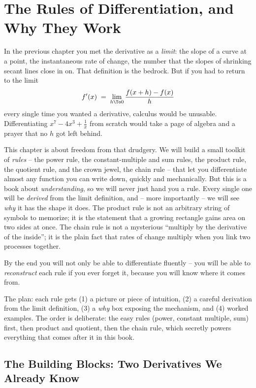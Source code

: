 \chapter{The Rules of Differentiation, and Why They Work}

In the previous chapter you met the derivative as a \emph{limit}: the slope of a curve
at a point, the instantaneous rate of change, the number that the slopes of shrinking
secant lines close in on. That definition is the bedrock. But if you had to return to
the limit
\[
  f'(x) \;=\; \lim_{h\To 0}\frac{f(x+h)-f(x)}{h}
\]
every single time you wanted a derivative, calculus would be unusable. Differentiating
$x^7 - 4x^3 + \tfrac{1}{x}$ from scratch would take a page of algebra and a prayer that
no $h$ got left behind.

This chapter is about freedom from that drudgery. We will build a small toolkit of
\emph{rules} -- the power rule, the constant-multiple and sum rules, the product rule,
the quotient rule, and the crown jewel, the chain rule -- that let you differentiate
almost any function you can write down, quickly and mechanically. But this is a book
about \emph{understanding}, so we will never just hand you a rule. Every single one will
be \emph{derived} from the limit definition, and -- more importantly -- we will see
\emph{why} it has the shape it does. The product rule is not an arbitrary string of
symbols to memorize; it is the statement that a growing rectangle gains area on two
sides at once. The chain rule is not a mysterious ``multiply by the derivative of the
inside''; it is the plain fact that rates of change multiply when you link two processes
together.

By the end you will not only be able to differentiate fluently -- you will be able to
\emph{reconstruct} each rule if you ever forget it, because you will know where it comes
from.

\begin{focusbox}
The plan: each rule gets (1) a picture or piece of intuition, (2) a careful derivation
from the limit definition, (3) a \emph{why} box exposing the mechanism, and (4) worked
examples. The order is deliberate: the easy rules (power, constant multiple, sum) first,
then product and quotient, then the chain rule, which secretly powers everything that
comes after it in this book.
\end{focusbox}

\section{The Building Blocks: Two Derivatives We Already Know}
\label{ch11:building-blocks}

